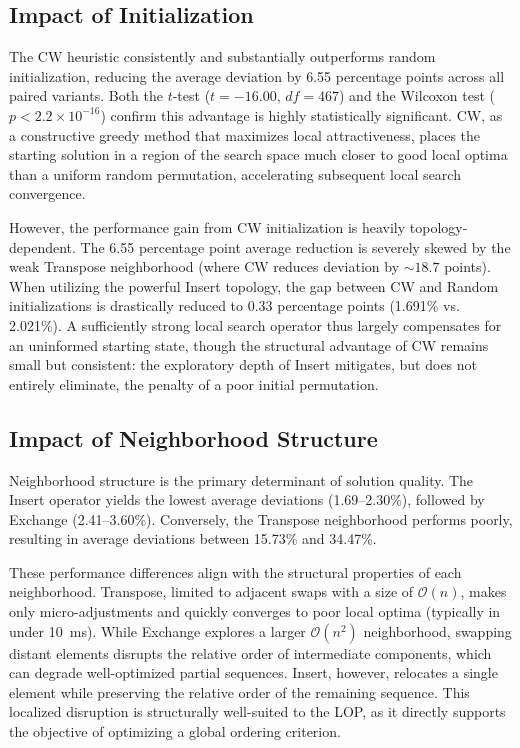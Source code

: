 \documentclass[11pt, a4paper]{article}
\begin{document}
\subsection{Impact of Initialization}

The CW heuristic consistently and substantially outperforms random initialization, reducing the average deviation by 6.55 percentage points across all paired variants. Both the $t$-test ($t = -16.00$, $df = 467$) and the Wilcoxon test ($p < 2.2 \times 10^{-16}$) confirm this advantage is highly statistically significant. CW, as a constructive greedy method that maximizes local attractiveness, places the starting solution in a region of the search space much closer to good local optima than a uniform random permutation, accelerating subsequent local search convergence.

However, the performance gain from CW initialization is heavily topology-dependent. The 6.55 percentage point average reduction is severely skewed by the weak Transpose neighborhood (where CW reduces deviation by $\sim 18.7$ points). When utilizing the powerful Insert topology, the gap between CW and Random initializations is drastically reduced to 0.33 percentage points (1.691\% vs. 2.021\%). A sufficiently strong local search operator thus largely compensates for an uninformed starting state, though the structural advantage of CW remains small but consistent: the exploratory depth of Insert mitigates, but does not entirely eliminate, the penalty of a poor initial permutation.

\subsection{Impact of Neighborhood Structure}

Neighborhood structure is the primary determinant of solution quality. The Insert operator yields the lowest average deviations (1.69--2.30\%), followed by Exchange (2.41--3.60\%). Conversely, the Transpose neighborhood performs poorly, resulting in average deviations between 15.73\% and 34.47\%.

These performance differences align with the structural properties of each neighborhood. Transpose, limited to adjacent swaps with a size of $\mathcal{O}(n)$, makes only micro-adjustments and quickly converges to poor local optima (typically in under 10~ms). While Exchange explores a larger $\mathcal{O}(n^2)$ neighborhood, swapping distant elements disrupts the relative order of intermediate components, which can degrade well-optimized partial sequences. Insert, however, relocates a single element while preserving the relative order of the remaining sequence. This localized disruption is structurally well-suited to the LOP, as it directly supports the objective of optimizing a global ordering criterion.
\end{document}
